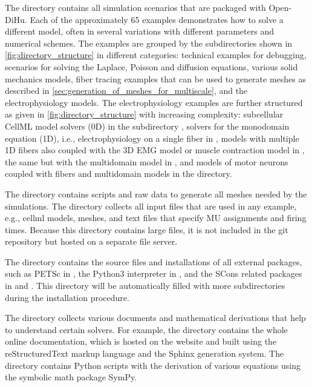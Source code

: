 The  directory contains all simulation scenarios that are packaged with Open-\break DiHu. Each of the approximately 65 examples demonstrates how to solve a different model, often in several variations with different parameters and numerical schemes. 
The examples are grouped by the subdirectories shown in \cref{fig:directory_structure} in different categories: technical examples for debugging, scenarios for solving the Laplace, Poisson and diffusion equations, various solid mechanics models, fiber tracing examples that can be used to generate meshes as described in \cref{sec:generation_of_meshes_for_multiscale}, and the electrophysiology models. 
The electrophysiology examples are further structured as given in \cref{fig:directory_structure} with increasing complexity: 
subcellular CellML model solvers (0D) in the subdirectory , 
solvers for the monodomain equation (1D), i.e., electrophysiology on a single fiber in , 
models with multiple 1D fibers also coupled with the 3D EMG model or muscle contraction model in , 
the same but with the multidomain model in , 
and models of motor neurons coupled with fibers and multidomain models in the  directory. 

The directory  contains scripts and raw data to generate all meshes needed by the simulations. The directory  collects all input files that are used in any example, e.g., cellml models, meshes, and text files that specify MU assignments and firing times. Because this directory contains large files, it is not included in the git repository but hosted on a separate file server.

The  directory contains the source files and installations of all external packages, such as PETSc in , the Python3 interpreter in , and the SCons related packages in  and . This directory will be automatically filled with more subdirectories during the installation procedure.

The  directory collects various documents and mathematical derivations that help to understand certain solvers. For example, the directory  contains the whole online documentation, which is hosted on the  website \cite{opendihuWeb} and built using the reStructuredText markup language and the Sphinx generation system. The  directory contains Python scripts with the derivation of various equations using the symbolic math package SymPy.

